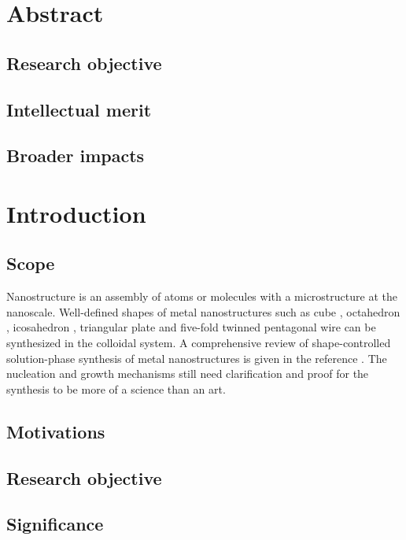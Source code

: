 \section{Abstract}

\subsection{Research objective}

\subsection{Intellectual merit}

\subsection{Broader impacts}

\section{Introduction}

\subsection{Scope}

Nanostructure is an assembly of atoms or molecules with a microstructure at the nanoscale. Well-defined shapes of metal nanostructures such as cube \cite{Im_2005}, octahedron \cite{Xia_2012}, icosahedron \cite{Xiong_2007}, triangular plate \cite{Lofton_2005} and five-fold twinned pentagonal wire \cite{Tsuji_2008} can be synthesized in the colloidal system. A comprehensive review of shape-controlled solution-phase synthesis of metal nanostructures is given in the reference \cite{Xia_2008}. The nucleation and growth mechanisms still need clarification and proof for the synthesis to be more of a science than an art. 

\subsection{Motivations}

\subsection{Research objective}

\subsection{Significance}

